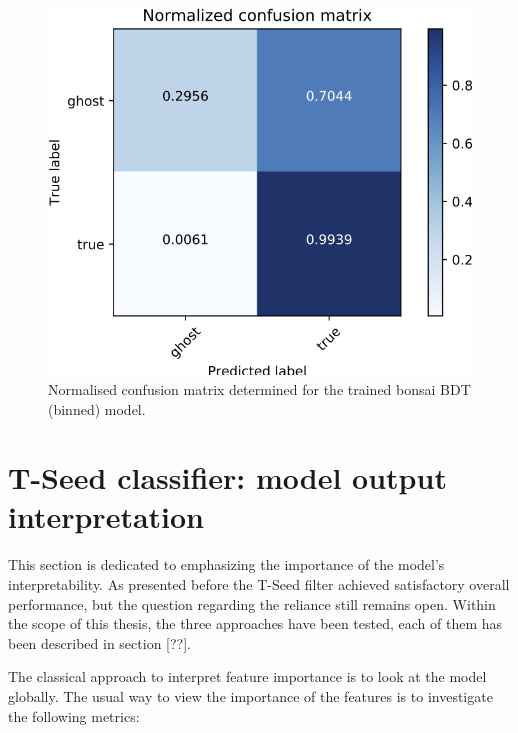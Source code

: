 \begin{figure}
\centering
\hspace*{-1cm}\includegraphics[scale=0.6]{figures/bBDT_normalized_cm.png}
\caption{Normalised confusion matrix determined for the trained bonsai BDT (binned) model.}
\label{fig:CM normalized}
\end{figure}



\section{T-Seed classifier: model output interpretation}

This section is dedicated to emphasizing the importance of the model's interpretability. As presented before the T-Seed filter achieved satisfactory overall performance, but the question regarding the reliance still remains open.
Within the scope of this thesis, the three approaches have been tested, each of them has been described in section [??]. 

The classical approach to interpret feature importance is to look at the model globally. The  usual way to view the importance of the features is to investigate the following metrics: 

